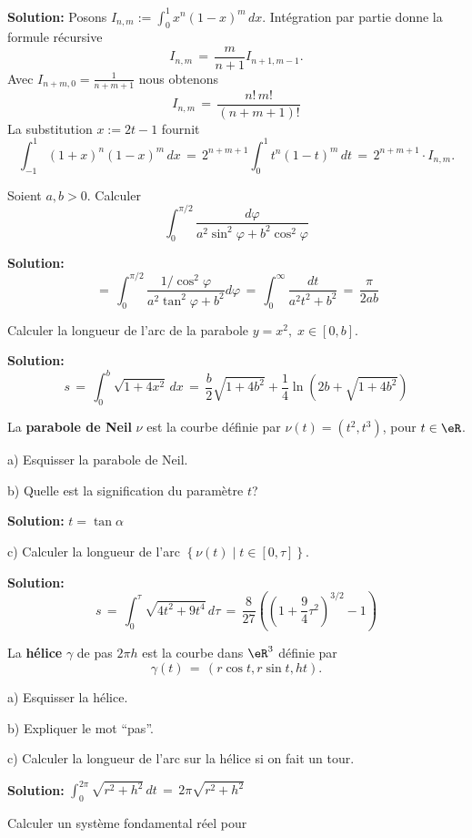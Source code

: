 {\bf Solution:}
Posons $I_{n,m} := \int_0^1 x^n (1-x)^m \,dx$.
Intégration par partie donne
la formule récursive
$$
I_{n,m} \,=\, \frac {m}{n+1} I_{n+1,m-1}.
$$
Avec $I_{n+m,0} = \frac{1}{n+m+1}$ nous obtenons
$$
I_{n,m} \,=\, \frac{n!\,m!}{(n+m+1)!}
$$
La substitution $x := 2t-1$ fournit
$$
\int_{-1}^1 (1+x)^n (1-x)^m \,dx
\,=\, 2^{n+m+1} \int_0^1 t^n (1-t)^m \,dt \,=\,  2^{n+m+1} 
\cdot I_{n,m}. 
$$




\exerNico 
Soient $a,b >0$. 
Calculer
$$
\int_0^{\pi /2} \displaystyle \frac{d \varphi}{a^2 \sin^2 \varphi + b^2 \cos^2 \varphi}
$$

{\bf Solution:}
$$
\,=\, \int_0^{\pi /2} \frac{1 / \cos^2 \varphi}{a^2 \tan^2 \varphi+b^2} d\varphi \,=\, \int_0^\infty \frac {dt}{a^2t^2 + b^2} \,=\, \frac{\pi}{2ab}  
$$


\exerNico  
Calculer la longueur de l'arc de la parabole $y = x^2,\;x \in [0,b]$.

\medskip
{\bf Solution:}
$$
s \,=\, \int_0^b \sqrt{1+4x^2} \,dx \,=\, \frac b 2 \sqrt{1+4b^2}+ \frac 14 \ln \left(2b+ \sqrt{1+4b^2} \right)
$$


\exerNico  
La {\bf parabole de Neil} $\nu$ est la courbe définie par $\nu (t) = (t^2,t^3)$, pour  $t \in \eR$.

\medskip
a)
Esquisser la parabole de Neil.

\medskip
b)
Quelle est la signification du paramètre $t$?

\medskip
{\bf Solution:} $t = \tan \alpha$

\medskip
c)
Calculer la longueur de l'arc 
$\left\{ \nu (t) \mid t \in [0,\tau] \right\}$.


\medskip
{\bf Solution:}
$$
s \,=\, \int_0^\tau \sqrt{4 t^2+9t^4} \,d\tau \,=\, \frac{8}{27} \left( \left(1+ \frac 94 \tau^2\right)^{3/2}-1 \right)
$$



\exerNico  
La {\bf hélice} $\gamma$ de pas $2 \pi h$ est la courbe dans $\eR^3$ définie par
$$
\gamma(t) \,=\, \left( r \cos t , r \sin t , h t \right)  .
$$


\medskip
a)
Esquisser la hélice.

\medskip
b)
Expliquer le mot ``pas''.


\medskip
c)
Calculer la longueur de l'arc sur la hélice si on fait un tour.

\medskip
{\bf Solution:} 
$\int_0^{2\pi} \sqrt{r^2+h^2} \,dt \,=\, 2 \pi \sqrt{r^2+h^2}$


\bigskip
\exerNico 
Calculer un système fondamental réel pour

